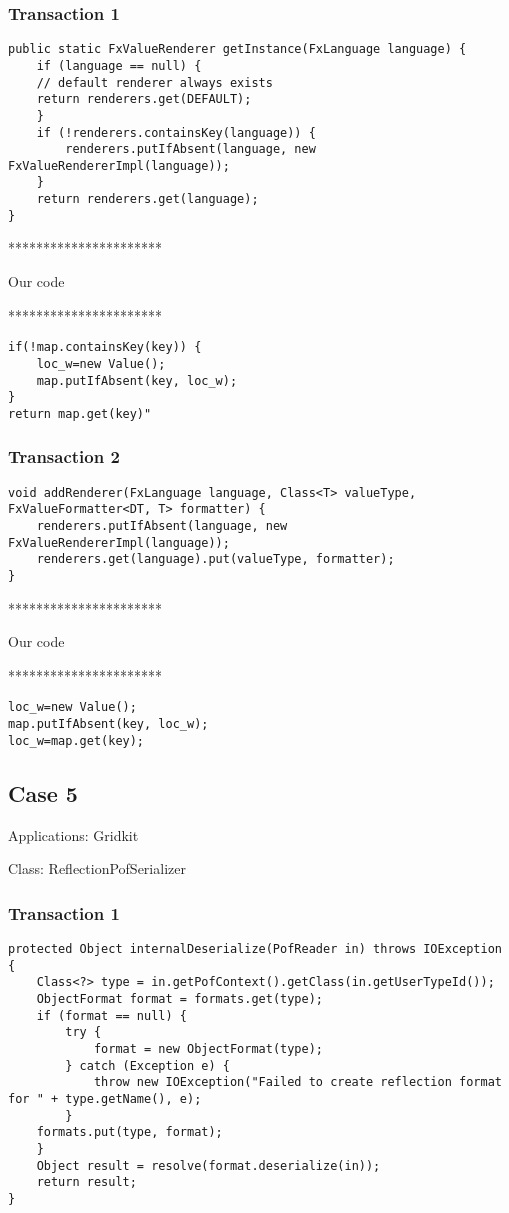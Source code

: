 \subsubsection{Transaction 1}
\begin{lstlisting}
public static FxValueRenderer getInstance(FxLanguage language) {
	if (language == null) {
	// default renderer always exists
	return renderers.get(DEFAULT);
	}
	if (!renderers.containsKey(language)) {
		renderers.putIfAbsent(language, new FxValueRendererImpl(language));
	}
	return renderers.get(language);
}
\end{lstlisting}


**********************

Our code

**********************

\begin{lstlisting}
if(!map.containsKey(key)) {
	loc_w=new Value();
	map.putIfAbsent(key, loc_w);
}
return map.get(key)"
\end{lstlisting}

\subsubsection{Transaction 2}
\begin{lstlisting}
void addRenderer(FxLanguage language, Class<T> valueType, FxValueFormatter<DT, T> formatter) {
	renderers.putIfAbsent(language, new FxValueRendererImpl(language));
	renderers.get(language).put(valueType, formatter);
}
\end{lstlisting}


**********************

Our code

**********************

\begin{lstlisting}
loc_w=new Value();
map.putIfAbsent(key, loc_w);
loc_w=map.get(key);
\end{lstlisting}

\subsection{Case 5}
Applications: Gridkit

Class: ReflectionPofSerializer

\subsubsection{Transaction 1}
\begin{lstlisting}
protected Object internalDeserialize(PofReader in) throws IOException {
	Class<?> type = in.getPofContext().getClass(in.getUserTypeId());
	ObjectFormat format = formats.get(type);
	if (format == null) {
		try {
			format = new ObjectFormat(type);
		} catch (Exception e) {
			throw new IOException("Failed to create reflection format for " + type.getName(), e);
		}
	formats.put(type, format);
	}
	Object result = resolve(format.deserialize(in));
	return result;
}
\end{lstlisting}


